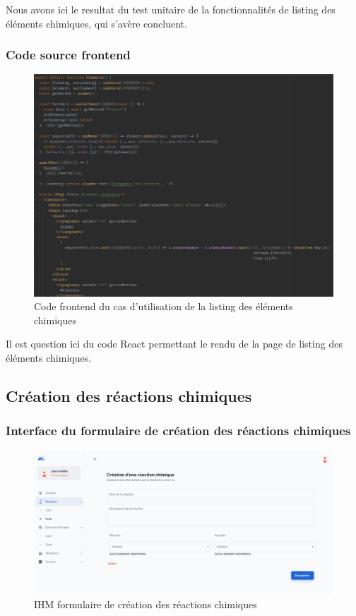 Nous avons ici le resultat du test unitaire de la fonctionnalités de listing des éléments chimiques, qui s'avère concluent.

\subsubsection{Code source frontend}

\begin{figure}[H]
	\centering
	\includegraphics[width=1\textwidth]{img/fetl}
	\caption{Code frontend du cas d'utilisation de la listing des éléments chimiques}
\end{figure}

Il est question ici du code React permettant le rendu de la page de listing des éléments chimiques.

\subsection{Création des réactions chimiques}

\subsubsection{Interface du formulaire de création des réactions chimiques}

\begin{figure}[H]
	\centering
	\includegraphics[width=1\textwidth]{img/icrc}
	\caption{IHM formulaire de création des réactions chimiques}
\end{figure}

